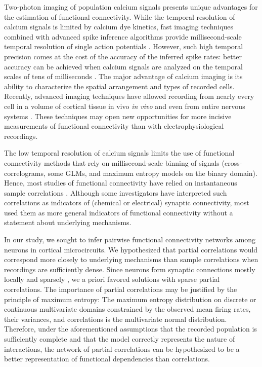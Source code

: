 \documentclass[10pt]{article}
\begin{document}
Two-photon imaging of population calcium signals presents unique advantages for the estimation of functional connectivity.  While the temporal resolution of calcium signals is limited by calcium dye kinetics, fast imaging techniques combined with advanced spike inference algorithms provide millisecond-scale temporal resolution of single action potentials \cite{Grewe:2010}. However, such high temporal precision comes at the cost of the accuracy of the inferred spike rates: better accuracy can be achieved when calcium signals are analyzed on the temporal scales of tens of milliseconds \cite{Cotton:2013}.  The major advantage of calcium imaging is its ability to characterize the spatial arrangement and types of recorded cells.  Recently, advanced imaging techniques have allowed recording from nearly every cell in a volume of cortical tissue in vivo \emph{in vivo} \cite{Katona:2012, Cotton:2013} and even from entire nervous systems \cite{Leung:2013, Ahrens:2013}.  These techniques may open new opportunities for more incisive measurements of functional connectivity than with electrophysiological recordings.  

The low temporal resolution of calcium signals limits the use of functional connectivity methods that rely on millisecond-scale binning of signals (cross-correlograms, some GLMs, and maximum entropy models on the binary domain).  Hence, most studies of functional connectivity have relied on instantaneous sample correlations \cite{Greenberg:2008, Golshani:2009, Hofer:2011, Malmersjo:2013} .  Although some investigators have interpreted such correlations as indicators of (chemical or electrical) synaptic connectivity, most used them as more general indicators of functional connectivity without a statement about underlying mechanisms. 

In our study, we sought to infer pairwise functional connectivity networks among neurons in cortical microcircuits. We hypothesized that partial correlations would correspond more closely to underlying mechanisms than sample correlations when recordings are sufficiently dense.  Since neurons form synaptic connections mostly locally and sparsely \cite{Perin:2011}, we a priori favored solutions with sparse partial correlations.  The importance of partial correlations may be justified by the principle of maximum entropy: The maximum entropy distribution on discrete or continuous multivariate domains constrained by the observed mean firing rates, their variances, and correlations is the multivariate normal distribution.  Therefore, under the aforementioned assumptions that the recorded population is sufficiently complete and that the model correctly represents the nature of interactions, the network of partial correlations can be hypothesized to be a better representation of functional dependencies than correlations.
\end{document}
